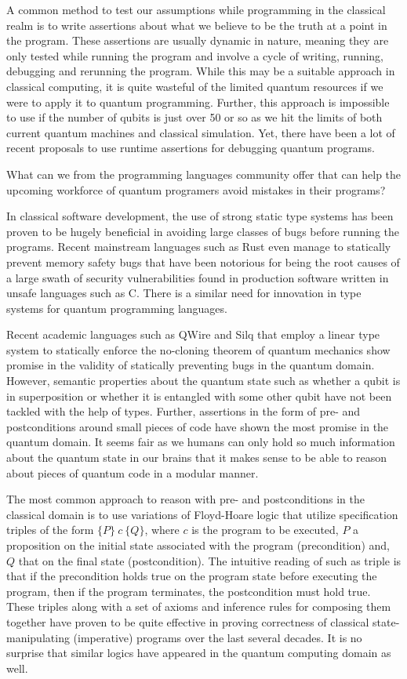 \documentclass[adraft,creativecommons]{eptcs}
\newcommand{\HoareT}[3]{
    \{#1\} ~#2~ \{#3\}
}
\theoremstyle{definition}
\theoremstyle{remark}
\begin{document}
A common method to test our assumptions while programming in the classical realm is to write assertions about what we believe to be the truth at a point in the program. These assertions are usually dynamic in nature, meaning they are only tested while running the program and involve a cycle of writing, running, debugging and rerunning the program. While this may be a suitable approach in classical computing, it is quite wasteful of the limited quantum resources if we were to apply it to quantum programming. Further, this approach is impossible to use if the number of qubits is just over 50 or so as we hit the limits of both current quantum machines and classical simulation. Yet, there have been a lot of recent proposals to use runtime assertions for debugging quantum programs.

What can we from the programming languages community offer that can help the upcoming workforce of quantum programers avoid mistakes in their programs?

In classical software development, the use of strong static type systems has been proven to be hugely beneficial in avoiding large classes of bugs before running the programs. Recent mainstream languages such as Rust even manage to statically prevent memory safety bugs that have been notorious for being the root causes of a large swath of security vulnerabilities found in production software written in unsafe languages such as C. There is a similar need for innovation in type systems for quantum programming languages.

Recent academic languages such as QWire and Silq that employ a linear type system to statically enforce the no-cloning theorem of quantum mechanics show promise in the validity of statically preventing bugs in the quantum domain. However, semantic properties about the quantum state such as whether a qubit is in superposition or whether it is entangled with some other qubit have not been tackled with the help of types. Further, assertions in the form of pre- and postconditions around small pieces of code have shown the most promise in the quantum domain. It seems fair as we humans can only hold so much information about the quantum state in our brains that it makes sense to be able to reason about pieces of quantum code in a modular manner.

The most common approach to reason with pre- and postconditions in the classical domain is to use variations of Floyd-Hoare logic that utilize specification triples of the form $\HoareT{P}{c}{Q}$, where $c$ is the program to be executed, $P$ a proposition on the initial state associated with the program (precondition) and, $Q$ that on the final state (postcondition). The intuitive reading of such as triple is that if the precondition holds true on the program state before executing the program, then if the program terminates, the postcondition must hold true. These triples along with a set of axioms and inference rules for composing them together have proven to be quite effective in proving correctness of classical state-manipulating (imperative) programs over the last several decades. It is no surprise that similar logics have appeared in the quantum computing domain as well.
\end{document}
